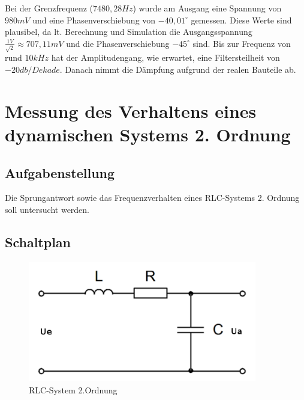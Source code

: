 \documentclass[12pt,a4paper,titlepage]{article}
\begin{document}
  Bei der Grenzfrequenz ($7480,28 Hz$) wurde am Ausgang eine Spannung von $980mV$ und eine Phasenverschiebung von $-40,01^{\circ}$ gemessen. Diese Werte sind plausibel, da lt. Berechnung und Simulation die Ausgangsspannung $\frac{1V}{\sqrt{2}} \approx 707,11mV$ und die Phasenverschiebung $-45^{\circ}$ sind. Bis zur Frequenz von rund $10kHz$ hat der Amplitudengang, wie erwartet, eine Filtersteilheit von $-20db/Dekade$. Danach nimmt die D\"ampfung aufgrund der realen Bauteile ab.






\section{Messung des Verhaltens eines dynamischen Systems 2. Ordnung}

\subsection{Aufgabenstellung}
Die Sprungantwort sowie das Frequenzverhalten eines RLC-Systems 2. Ordnung soll untersucht werden.

\subsection{Schaltplan}
\begin{figure}[H]
  \centering
  \includegraphics[width=100mm]{rlc_schaltplan.png}
  \caption{RLC-System 2.Ordnung}
\end{figure}
\end{document}
